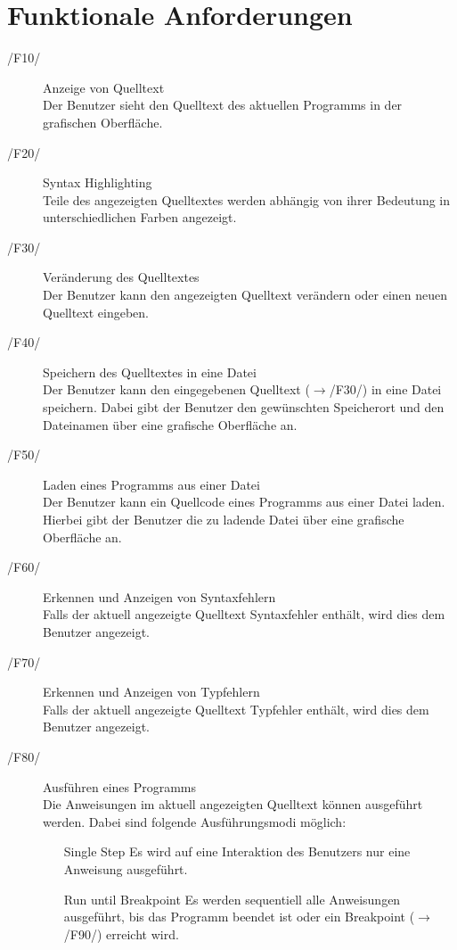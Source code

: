 \documentclass[a4paper,10pt]{article}
\begin{document}
\section{Funktionale Anforderungen}
\begin{description}
\item[/F10/] Anzeige von Quelltext\\
Der Benutzer sieht den Quelltext des aktuellen Programms in der grafischen Oberfläche.
\item[/F20/] Syntax Highlighting\\
Teile des angezeigten Quelltextes werden abhängig von ihrer Bedeutung in unterschiedlichen Farben angezeigt.
\item[/F30/] Veränderung des Quelltextes\\
Der Benutzer kann den angezeigten Quelltext verändern oder einen neuen Quelltext eingeben.
\item[/F40/] Speichern des Quelltextes in eine Datei\\
Der Benutzer kann den eingegebenen Quelltext ($\to$/F30/) in eine Datei speichern. Dabei gibt der Benutzer den gewünschten Speicherort und den Dateinamen über eine grafische Oberfläche an.
\item[/F50/] Laden eines Programms aus einer Datei\\
Der Benutzer kann ein Quellcode eines Programms aus einer Datei laden. Hierbei gibt der Benutzer die zu ladende Datei über eine grafische Oberfläche an.
\item[/F60/] Erkennen und Anzeigen von Syntaxfehlern\\
Falls der aktuell angezeigte Quelltext Syntaxfehler enthält, wird dies dem Benutzer angezeigt.
\item[/F70/] Erkennen und Anzeigen von Typfehlern\\
Falls der aktuell angezeigte Quelltext Typfehler enthält, wird dies dem Benutzer angezeigt.
\item[/F80/] Ausführen eines Programms\\
Die Anweisungen im aktuell angezeigten Quelltext können ausgeführt werden. Dabei sind folgende Ausführungsmodi möglich:
\begin{itemize}
  \leftskip=4cm
  \item[Single Step] Es wird auf eine Interaktion des Benutzers nur eine Anweisung ausgeführt.
  \item[Run until Breakpoint] Es werden sequentiell alle Anweisungen ausgeführt, bis das Programm beendet ist oder ein Breakpoint ($\to$/F90/) erreicht wird.

\end{itemize}
\end{description}
\end{document}
